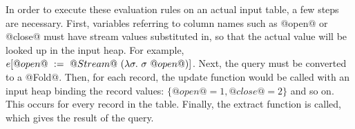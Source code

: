 In order to execute these evaluation rules on an actual input table, a few steps are necessary.
First, variables referring to column names such as @open@ or @close@ must have stream values substituted in, so that the actual value will be looked up in the input heap.
For example, $e[@open@~:=~@Stream@~(\lambda{}\sigma.~ \sigma~@open@)]$.
Next, the query must be converted to a @Fold@.
Then, for each record, the update function would be called with an input heap binding the record values: $\{@open@ = 1, @close@ = 2\}$ and so on.
This occurs for every record in the table.
Finally, the extract function is called, which gives the result of the query.

